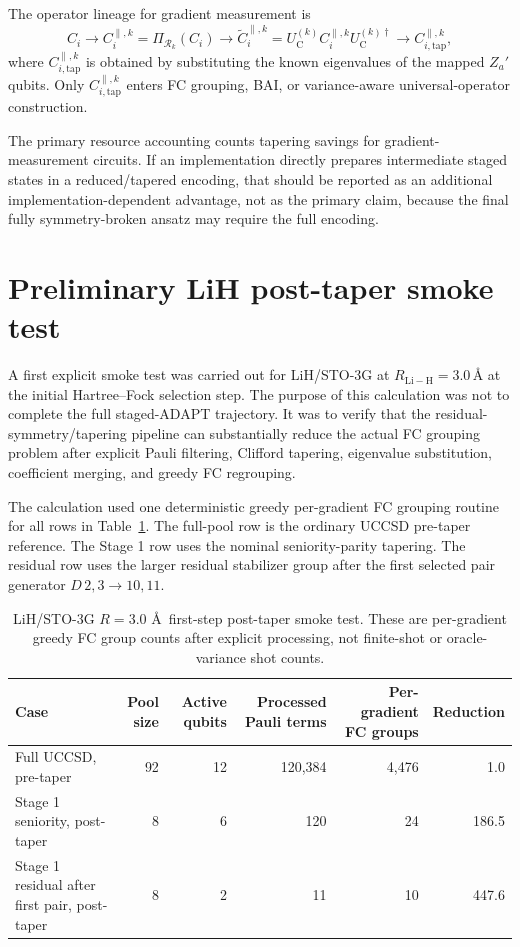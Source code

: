 \documentclass[11pt]{article}
\newcommand{\resgrp}{\mathcal R_k}
\begin{document}
The operator lineage for gradient measurement is
\begin{equation}
    C_i
    \longrightarrow C_i^{\parallel,k}=\Pi_{\resgrp}(C_i)
    \longrightarrow \widetilde C_i^{\parallel,k}
       = U_{\mathrm C}^{(k)}C_i^{\parallel,k}U_{\mathrm C}^{(k)\dagger}
    \longrightarrow C_{i,\mathrm{tap}}^{\parallel,k},
\end{equation}
where $C_{i,\mathrm{tap}}^{\parallel,k}$ is obtained by substituting the known eigenvalues of the mapped $Z_a'$ qubits. Only $C_{i,\mathrm{tap}}^{\parallel,k}$ enters FC grouping, BAI, or variance-aware universal-operator construction.

The primary resource accounting counts tapering savings for gradient-measurement circuits. If an implementation directly prepares intermediate staged states in a reduced/tapered encoding, that should be reported as an additional implementation-dependent advantage, not as the primary claim, because the final fully symmetry-broken ansatz may require the full encoding.


\section{Preliminary LiH post-taper smoke test}
\label{sec:lih-smoke-test}

A first explicit smoke test was carried out for LiH/STO-3G at $R_{\mathrm{Li-H}}=3.0\,\text{\AA}$ at the initial Hartree--Fock selection step. The purpose of this calculation was not to complete the full staged-ADAPT trajectory. It was to verify that the residual-symmetry/tapering pipeline can substantially reduce the actual FC grouping problem after explicit Pauli filtering, Clifford tapering, eigenvalue substitution, coefficient merging, and greedy FC regrouping.

The calculation used one deterministic greedy per-gradient FC grouping routine for all rows in Table~\ref{tab:lih-post-taper}. The full-pool row is the ordinary UCCSD pre-taper reference. The Stage 1 row uses the nominal seniority-parity tapering. The residual row uses the larger residual stabilizer group after the first selected pair generator $D\,2,3\to10,11$.

\begin{table}[H]
\centering
\small
\caption{LiH/STO-3G $R=3.0$ \AA\ first-step post-taper smoke test. These are per-gradient greedy FC group counts after explicit processing, not finite-shot or oracle-variance shot counts.}
\label{tab:lih-post-taper}
\begin{tabular}{lrrrrr}
\toprule
Case & Pool size & Active qubits & Processed Pauli terms & Per-gradient FC groups & Reduction \\
\midrule
Full UCCSD, pre-taper & 92 & 12 & 120,384 & 4,476 & 1.0 \\
Stage 1 seniority, post-taper & 8 & 6 & 120 & 24 & 186.5 \\
Stage 1 residual after first pair, post-taper & 8 & 2 & 11 & 10 & 447.6 \\
\bottomrule
\end{tabular}
\end{table}
\end{document}
